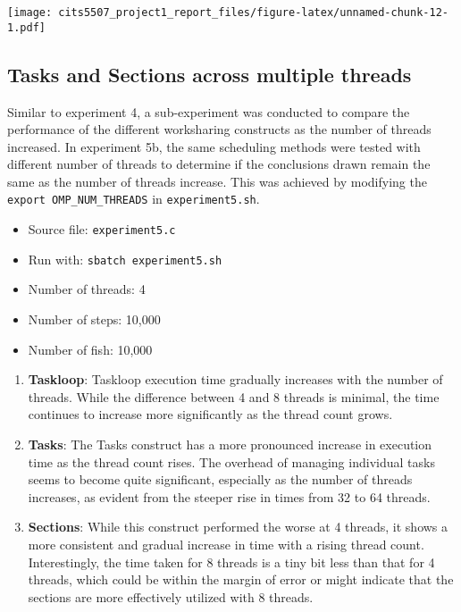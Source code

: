 \documentclass[
]{article}
\providecommand{\tightlist}{%
  \setlength{\itemsep}{0pt}\setlength{\parskip}{0pt}}
\begin{document}
\texttt{[image: cits5507\_project1\_report\_files/figure-latex/unnamed-chunk-12-1.pdf]}

\hypertarget{tasks-and-sections-across-multiple-threads}{%
\subsection{Tasks and Sections across multiple
threads}\label{tasks-and-sections-across-multiple-threads}}

Similar to experiment 4, a sub-experiment was conducted to compare the
performance of the different worksharing constructs as the number of
threads increased. In experiment 5b, the same scheduling methods were
tested with different number of threads to determine if the conclusions
drawn remain the same as the number of threads increase. This was
achieved by modifying the \texttt{export\ OMP\_NUM\_THREADS} in
\texttt{experiment5.sh}.

\begin{itemize}
\tightlist
\item
  Source file: \texttt{experiment5.c}
\item
  Run with: \texttt{sbatch\ experiment5.sh}
\item
  Number of threads: 4
\item
  Number of steps: 10,000
\item
  Number of fish: 10,000
\end{itemize}

\begin{enumerate}
\def\labelenumi{\arabic{enumi}.}
\item
  \textbf{Taskloop}: Taskloop execution time gradually increases with
  the number of threads. While the difference between 4 and 8 threads is
  minimal, the time continues to increase more significantly as the
  thread count grows.
\item
  \textbf{Tasks}: The Tasks construct has a more pronounced increase in
  execution time as the thread count rises. The overhead of managing
  individual tasks seems to become quite significant, especially as the
  number of threads increases, as evident from the steeper rise in times
  from 32 to 64 threads.
\item
  \textbf{Sections}: While this construct performed the worse at 4
  threads, it shows a more consistent and gradual increase in time with
  a rising thread count. Interestingly, the time taken for 8 threads is
  a tiny bit less than that for 4 threads, which could be within the
  margin of error or might indicate that the sections are more
  effectively utilized with 8 threads.
\end{enumerate}
\end{document}

